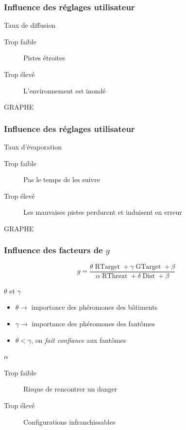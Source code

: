 \documentclass{beamer}
\begin{document}
\begin{frame}

  \frametitle{Influence des réglages utilisateur}

  \begin{block}{Taux de diffusion}
    \begin{description}
      \item[Trop faible]{Pistes étroites}
      \item[Trop élevé]{L'environnement est inondé}
    \end{description}
  \end{block}

  \vfill

  GRAPHE

\end{frame}

\begin{frame}

  \frametitle{Influence des réglages utilisateur}

  \begin{block}{Taux d'évaporation}
    \begin{description}
      \item[Trop faible]{Pas le temps de les suivre}
      \item[Trop élevé]{Les mauvaises pistes perdurent et induisent en
      erreur}
    \end{description}
  \end{block}

  \vfill

  GRAPHE

\end{frame}

\begin{frame}

  \frametitle{Influence des facteurs de $g$}

  $$g = \frac{ \theta \operatorname{RTarget} + \gamma \operatorname{GTarget} + \beta}{\alpha \operatorname{RThreat} + \delta \operatorname{Dist} + \beta}$$

  \vfill

  \begin{block}{$\theta$ et $\gamma$}
    \begin{itemize}
    \item{$\theta \rightarrow$ importance des phéromones des
      bâtiments}
    \item{$\gamma \rightarrow$ importance des phéromones des
      fantômes}
    \item{$\theta < \gamma$, on \textit{fait confiance} aux
      fantômes}
    \end{itemize}
  \end{block}

  \vfill

  \begin{block}{$\alpha$}
    \begin{description}
    \item[Trop faible]{Risque de rencontrer un danger}
    \item[Trop élevé]{Configurations infranchissables}
    \end{description}
  \end{block}

\end{frame}
\end{document}
